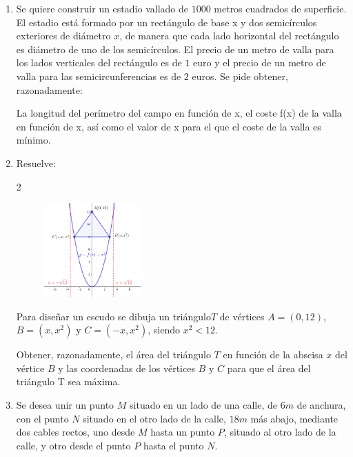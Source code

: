 \begin{enumerate}
\item 	Se quiere construir un estadio vallado de $1000$ metros 
cuadrados de superficie. El estadio está formado por un 
rectángulo de base x y dos semicírculos exteriores de 
diámetro $x$, de manera que cada lado horizontal del 
rectángulo es diámetro de uno de los semicírculos. El 
precio de un metro de valla para los lados verticales del 
rectángulo es de $1$ euro y el precio de un metro de valla 
para las semicircunferencias es de $2$ euros. Se pide obtener, 
razonadamente: 

La longitud del perímetro del campo en función de x,  el 
coste f(x) de la valla en función de x, así como  el valor de 
x para el que el coste de la valla es mínimo. 

 \rightline{\textcolor{gris}{el coste es mínimo para $x \approx 65.15m$}}

\clearpage

\item Resuelve:

\begin {multicols} {2}
	\begin{figure}[H]
		\centering
		\includegraphics[width=0.35\textwidth]{imagenes/imagenes05/T05IM47.png}
	\end{figure}
	
	Para diseñar un escudo se dibuja un triángulo$T$ de vértices $A = (0, 12)$, $B=(x,x^2)$ y $C=(-x,x^2)$, siendo $x^2 <12$.
	
	Obtener, razonadamente, el área del triángulo $T$ en función de la abscisa $x$ del vértice $B$ y las coordenadas de los vértices $B$ y $C$ para que el área del triángulo T sea máxima.
\end {multicols}


\rightline{\textcolor{gris}{Solución: $A(x)=12x-x^3; \quad $}}
\rightline{\textcolor{gris}{Área máxima para $x=2 \to B(2,4); ; C(.2,4)$}}

\item Se desea unir un punto $M$ situado en un lado de una calle, de $6 m$ de anchura, con el punto $N$ situado en el otro lado de la calle, $18 m$ más abajo, mediante dos cables rectos, uno desde $M$ hasta un punto $P$, situado al otro lado de la calle, y otro desde el punto $P$ hasta el punto $N$. 


\end{enumerate}
